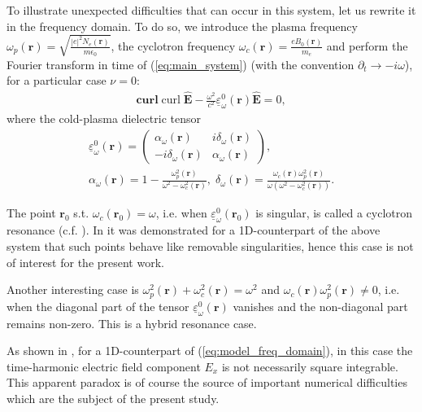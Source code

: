 {To illustrate unexpected difficulties that can occur in this system, let us rewrite it in the frequency domain. To do so, 
we introduce the plasma frequency $\omega_p(\mathbf{r})=\sqrt{\frac{|e|^2N_e(\mathbf{r})}{m\epsilon_0}}$, 
the cyclotron frequency $\omega_c(\mathbf{r})=\frac{e B_0(\mathbf{r})}{m_e}$ and perform the Fourier transform 
in time of (\ref{eq:main_system}) (with the convention $\partial_t\rightarrow -i\omega$), for a 
particular case $\nu=0$:
\begin{align}
\label{eq:model_freq_domain}
 \mathbf{curl}{\operatorname{curl}}\hat{\mathbf{E}}-\frac{\omega^2}{c^2}\underline{\varepsilon}^{0}_{\omega}(\mathbf{r})\hat{\mathbf{E}}=0,
\end{align}
where the cold-plasma dielectric tensor \cite[Chapter 1-2]{Stix}
\begin{align}
\nonumber
\underline{\varepsilon}^{0}_{\omega}(\mathbf{r})=\left(
 \begin{matrix}
  \alpha_{\omega}(\mathbf{r})& i\delta_{\omega}(\mathbf{r})\\
  -i\delta_{\omega}(\mathbf{r}) & \alpha_{\omega}(\mathbf{r})
 \end{matrix}
\right),\\
\label{eq:alpha_delta}
\alpha_{\omega}(\mathbf{r})=1-\frac{\omega_p^2(\mathbf{r})}{\omega^2-\omega_c^2(\mathbf{r})},\; \delta_{\omega}(\mathbf{r})=\frac{\omega_c(\mathbf{r})\omega_p^2(\mathbf{r})}{\omega(\omega^2-\omega_c^2(\mathbf{r}))}.
\end{align}

The point $\mathbf{r}_0$ s.t. $\omega_c(\mathbf{r}_0)=\omega$, i.e. when $\underline{\varepsilon}_{\omega}^{0}(\mathbf{r}_0)$ is singular, is called a cyclotron resonance (c.f. \cite[Chapter 1-5]{Stix}). 
In \cite{singular_solutions} it was demonstrated for a 1D-counterpart of the above system that such points behave like removable singularities, 
hence this case is not of interest for the present work. 

Another interesting case is $\omega_p^2(\mathbf{r})+\omega_c^2(\mathbf{r})=\omega^2$ and $\omega_c(\mathbf{r})\omega_p^2(\mathbf{r})\neq 0$, i.e. when the diagonal part of the tensor 
$\underline{\varepsilon}_{\omega}^{0}(\mathbf{r})$ vanishes and the non-diagonal part remains non-zero. This is a hybrid resonance case. 

As shown in \cite{Despres_2014, singular_solutions}, for a 1D-counterpart of (\ref{eq:model_freq_domain}), in this case the time-harmonic electric field component $E_x$ is not necessarily square 
integrable. This apparent paradox is of course the source of important numerical difficulties which are the subject of the present study. 


}
